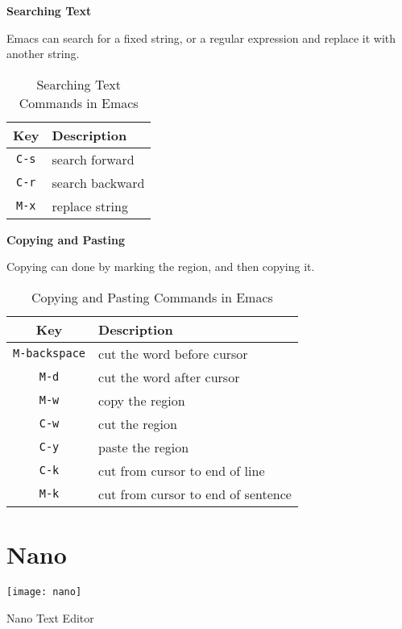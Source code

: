 \textbf{Searching Text}

Emacs can search for a fixed string, or a regular expression
and replace it with another string.

\begin{table}[h!]
  \caption{Searching Text Commands in Emacs}
  \begin{tabular}{c l}
    \toprule
    Key & Description \\
    \midrule
    \lstinline|C-s| & search forward \\
    \lstinline|C-r| & search backward \\
    \lstinline|M-x| & replace string \\
    \bottomrule
  \end{tabular}
\end{table}

\textbf{Copying and Pasting}

Copying can done by marking the region, and then copying it.

\begin{table}[h!]
  \caption{Copying and Pasting Commands in Emacs}
  \begin{tabular}{c l}
    \toprule
    Key & Description \\
    \midrule
    \lstinline|M-backspace| & cut the word before cursor \\
    \lstinline|M-d| & cut the word after cursor \\
    \lstinline|M-w| & copy the region \\
    \lstinline|C-w| & cut the region \\
    \lstinline|C-y| & paste the region \\
    \lstinline|C-k| & cut from cursor to end of line \\
    \lstinline|M-k| & cut from cursor to end of sentence \\
    \bottomrule
  \end{tabular}
\end{table}

\vfill
\pagebreak
\section{Nano}

\begin{marginfigure}
  \texttt{[image: nano]}
  \caption{Nano Text Editor}
\end{marginfigure}

